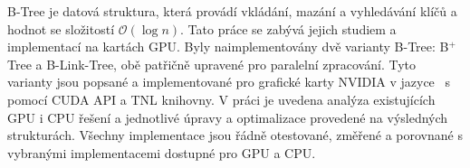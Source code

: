 B-Tree je datová struktura, která provádí vkládání, mazání a vyhledávání klíčů a hodnot se složitostí $\mathcal{O}(\log{n})$. Tato práce se zabývá jejich studiem a implementací na kartách GPU. Byly naimplementovány dvě varianty B-Tree: B$^+$Tree a B-Link-Tree, obě patřičně upravené pro paralelní zpracování. Tyto varianty jsou popsané a implementované pro grafické karty NVIDIA v jazyce \CC\ s pomocí CUDA API a TNL knihovny. V práci je uvedena analýza existujících GPU i CPU řešení a jednotlivé úpravy a optimalizace provedené na výsledných strukturách. Všechny implementace jsou řádně otestované, změřené a porovnané s vybranými implementacemi dostupné pro GPU a CPU.